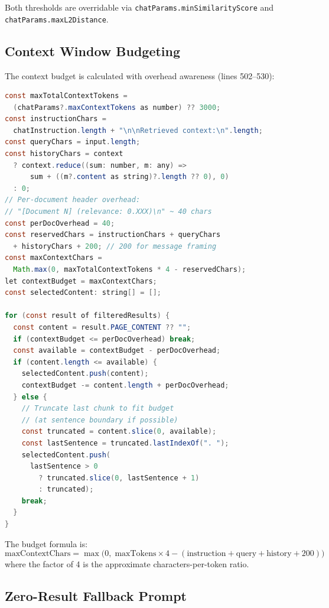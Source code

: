 \documentclass[11pt]{article}
\begin{document}
Both thresholds are overridable via \texttt{chatParams.minSimilarityScore} and
\texttt{chatParams.maxL2Distance}.

\subsection{Context Window Budgeting}

The context budget is calculated with overhead awareness (lines 502--530):

\begin{lstlisting}[language=Java,caption={Context budget calculation --- lines 502--530}]
const maxTotalContextTokens =
  (chatParams?.maxContextTokens as number) ?? 3000;
const instructionChars =
  chatInstruction.length + "\n\nRetrieved context:\n".length;
const queryChars = input.length;
const historyChars = context
  ? context.reduce((sum: number, m: any) =>
      sum + ((m?.content as string)?.length ?? 0), 0)
  : 0;
// Per-document header overhead:
// "[Document N] (relevance: 0.XXX)\n" ~ 40 chars
const perDocOverhead = 40;
const reservedChars = instructionChars + queryChars
  + historyChars + 200; // 200 for message framing
const maxContextChars =
  Math.max(0, maxTotalContextTokens * 4 - reservedChars);
let contextBudget = maxContextChars;
const selectedContent: string[] = [];

for (const result of filteredResults) {
  const content = result.PAGE_CONTENT ?? "";
  if (contextBudget <= perDocOverhead) break;
  const available = contextBudget - perDocOverhead;
  if (content.length <= available) {
    selectedContent.push(content);
    contextBudget -= content.length + perDocOverhead;
  } else {
    // Truncate last chunk to fit budget
    // (at sentence boundary if possible)
    const truncated = content.slice(0, available);
    const lastSentence = truncated.lastIndexOf(". ");
    selectedContent.push(
      lastSentence > 0
        ? truncated.slice(0, lastSentence + 1)
        : truncated);
    break;
  }
}
\end{lstlisting}

The budget formula is:
\[
\text{maxContextChars} = \max\!\big(0,\; \text{maxTokens} \times 4 - (\text{instruction} + \text{query} + \text{history} + 200)\big)
\]
where the factor of 4 is the approximate characters-per-token ratio.

\subsection{Zero-Result Fallback Prompt}
\end{document}
